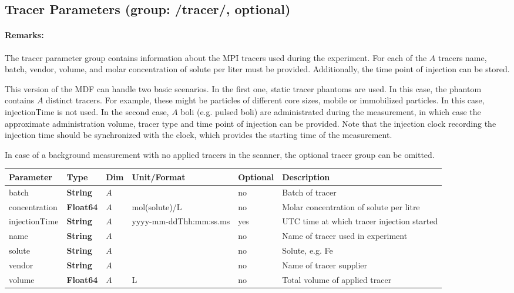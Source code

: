 \documentclass[landscape,a4paper]{article} %
\newcommand{\inltab}[1]{{\ttfamily\bfseries\color{blue}#1}}
\newcommand{\inlvar}[1]{{\ttfamily#1}}
\begin{document}
\subsection{Tracer Parameters (group: \inlvar{/tracer/}, optional)}

\begin{multicols}{2}
\paragraph{Remarks:} The tracer parameter group contains information about the MPI tracers used during the experiment. For each of the $A$ tracers \inlvar{name}, \inlvar{batch}, \inlvar{vendor}, \inlvar{volume},  and molar \inlvar{concentration} of \inlvar{solute} per liter must be provided. Additionally, the time point of injection can be stored.

This version of the MDF can handle two basic scenarios. In the first one, static tracer phantoms are used. In this case, the phantom contains $A$ distinct tracers. For example, these might be particles of different core sizes, mobile or immobilized particles. In this case, \inlvar{injectionTime} is not used. In the second case, $A$ boli (e.g. pulsed boli) are administrated during the measurement, in which case the approximate administration volume, tracer type and time point of injection can be provided. Note that the injection clock recording the injection time should be synchronized with the clock, which provides the starting time of the measurement.

In case of a background measurement with no applied tracers in the scanner, the optional tracer group can be omitted.
\end{multicols}

\setlength\extrarowheight{5pt}
\noindent \begin{tabularx}{\columnwidth}{lllllX} 
\textbf{Parameter} & \textbf{Type} & \textbf{Dim} & \textbf{Unit/Format} & \textbf{Optional} & \textbf{Description} \\ \hline 
\inlvar{batch} & \inltab{String} & $A$ & & no & Batch of tracer \\ \hline
\inlvar{concentration} & \inltab{Float64} & $A$ & mol(\inlvar{solute})/L & no & Molar concentration of \inlvar{solute} per litre \\ \hline
\inlvar{injectionTime} & \inltab{String} & $A$ & yyyy-mm-ddThh:mm:ss.ms & yes & UTC time at which tracer injection started \\ \hline
\inlvar{name} & \inltab{String} & $A$ & & no & Name of tracer used in experiment \\ \hline
\inlvar{solute} & \inltab{String} & $A$ & & no & Solute, e.g. Fe \\ \hline
\inlvar{vendor} & \inltab{String} & $A$ & & no & Name of tracer supplier \\ \hline
\inlvar{volume} & \inltab{Float64} & $A$ & L & no & Total volume of applied tracer \\ \hline
\end{tabularx}
\setlength\extrarowheight{0pt}
\end{document}
